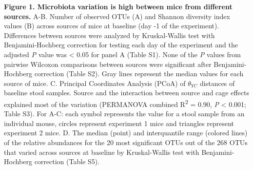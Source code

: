 \documentclass[
  11pt,
]{article}
\begin{document}
\textbf{Figure 1. Microbiota variation is high between mice from
different sources.} A-B. Number of observed OTUs (A) and Shannon
diversity index values (B) across sources of mice at baseline (day -1 of
the experiment). Differences between sources were analyzed by
Kruskal-Wallis test with Benjamini-Hochberg correction for testing each
day of the experiment and the adjusted \emph{P} value was \textless{}
0.05 for panel A (Table S1). None of the \emph{P} values from pairwise
Wilcoxon comparisons between sources were significant after
Benjamini-Hochberg correction (Table S2). Gray lines represent the
median values for each source of mice. C. Principal Coordinates Analysis
(PCoA) of \(\theta_{YC}\) distances of baseline stool samples. Source
and the interaction between source and cage effects explained most of
the variation (PERMANOVA combined R\textsuperscript{2} = 0.90, \emph{P}
\textless{} 0.001; Table S3). For A-C: each symbol represents the value
for a stool sample from an individual mouse, circles represent
experiment 1 mice and triangles represent experiment 2 mice. D. The
median (point) and interquantile range (colored lines) of the relative
abundances for the 20 most significant OTUs out of the 268 OTUs that
varied across sources at baseline by Kruskal-Wallis test with
Benjamini-Hochberg correction (Table S5).

\newpage
\end{document}
